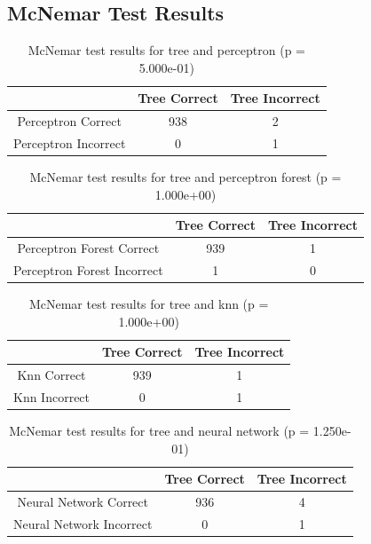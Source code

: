 \documentclass[paper=a4, fontsize=11pt]{scrartcl} %
\begin{document}
\begin{appendices}
\section{McNemar Test Results} \label{app: mcnemar}

\begin{table}[H]
	\centering
	\caption{McNemar test results for tree and perceptron (p = 5.000e-01)}
	\begin{tabular}{|c||c|c|}
		\hline
		& Tree Correct & Tree Incorrect \\ \hline \hline
		Perceptron Correct & 938 & 2 \\ \hline
		Perceptron Incorrect& 0 & 1 \\ \hline
	\end{tabular}
\end{table}

\begin{table}[H]
	\centering
	\caption{McNemar test results for tree and perceptron forest (p = 1.000e+00)}
	\begin{tabular}{|c||c|c|}
		\hline
		& Tree Correct & Tree Incorrect \\ \hline \hline
		Perceptron Forest Correct & 939 & 1 \\ \hline
		Perceptron Forest Incorrect& 1 & 0 \\ \hline
	\end{tabular}
\end{table}

\begin{table}[H]
	\centering
	\caption{McNemar test results for tree and knn (p = 1.000e+00)}
	\begin{tabular}{|c||c|c|}
		\hline
		& Tree Correct & Tree Incorrect \\ \hline \hline
		Knn Correct & 939 & 1 \\ \hline
		Knn Incorrect& 0 & 1 \\ \hline
	\end{tabular}
\end{table}

\begin{table}[H]
	\centering
	\caption{McNemar test results for tree and neural network (p = 1.250e-01)}
	\begin{tabular}{|c||c|c|}
		\hline
		& Tree Correct & Tree Incorrect \\ \hline \hline
		Neural Network Correct & 936 & 4 \\ \hline
		Neural Network Incorrect& 0 & 1 \\ \hline
	\end{tabular}
\end{table}


\end{appendices}
\end{document}

